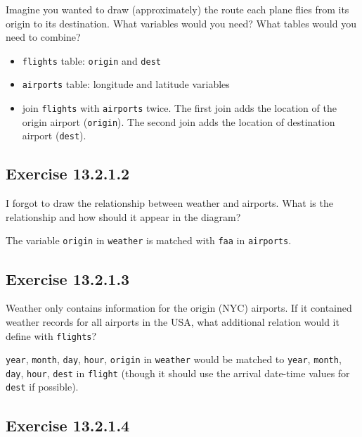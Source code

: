 \documentclass[]{book}
\providecommand{\tightlist}{%
  \setlength{\itemsep}{0pt}\setlength{\parskip}{0pt}}
\theoremstyle{plain}
\theoremstyle{remark}
\begin{document}
Imagine you wanted to draw (approximately) the route each plane flies
from its origin to its destination. What variables would you need? What
tables would you need to combine?

\begin{itemize}
\tightlist
\item
  \texttt{flights} table: \texttt{origin} and \texttt{dest}
\item
  \texttt{airports} table: longitude and latitude variables
\item
  join \texttt{flights} with \texttt{airports} twice. The first join
  adds the location of the origin airport (\texttt{origin}). The second
  join adds the location of destination airport (\texttt{dest}).
\end{itemize}

\hypertarget{exercise-13.2.1.2}{%
\subsection*{\texorpdfstring{Exercise
{13.2.1.2}}{Exercise 13.2.1.2}}\label{exercise-13.2.1.2}}

I forgot to draw the relationship between weather and airports. What is
the relationship and how should it appear in the diagram?

The variable \texttt{origin} in \texttt{weather} is matched with
\texttt{faa} in \texttt{airports}.

\hypertarget{exercise-13.2.1.3}{%
\subsection*{\texorpdfstring{Exercise
{13.2.1.3}}{Exercise 13.2.1.3}}\label{exercise-13.2.1.3}}

Weather only contains information for the origin (NYC) airports. If it
contained weather records for all airports in the USA, what additional
relation would it define with \texttt{flights}?

\texttt{year}, \texttt{month}, \texttt{day}, \texttt{hour},
\texttt{origin} in \texttt{weather} would be matched to \texttt{year},
\texttt{month}, \texttt{day}, \texttt{hour}, \texttt{dest} in
\texttt{flight} (though it should use the arrival date-time values for
\texttt{dest} if possible).

\hypertarget{exercise-13.2.1.4}{%
\subsection*{\texorpdfstring{Exercise
{13.2.1.4}}{Exercise 13.2.1.4}}\label{exercise-13.2.1.4}}
\end{document}
